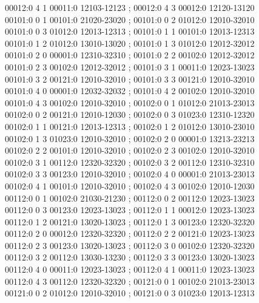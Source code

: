 \documentclass[11pt]{article}
\theoremstyle{remark}
\numberwithin{equation}{section}
\numberwithin{table}{section}
\begin{document}
\begin{flushleft}
00012:0 4 1 00011:0 12103-12123 ; 00012:0 4 3 00012:0 12120-13120\\
00101:0 0 1 00101:0 21020-23020 ; 00101:0 0 2 01012:0 12010-32010\\
00101:0 0 3 01012:0 12013-12313 ; 00101:0 1 1 00101:0 12013-12313\\
00101:0 1 2 01012:0 13010-13020 ; 00101:0 1 3 01012:0 12012-32012\\
00101:0 2 0 00001:0 12310-32310 ; 00101:0 2 2 00102:0 12012-32012\\
00101:0 2 3 00102:0 12012-32012 ; 00101:0 3 1 00011:0 12023-13023\\
00101:0 3 2 00121:0 12010-32010 ; 00101:0 3 3 00121:0 12010-32010\\
00101:0 4 0 00001:0 12032-32032 ; 00101:0 4 2 00102:0 12010-32010\\
00101:0 4 3 00102:0 12010-32010 ; 00102:0 0 1 01012:0 21013-23013\\
00102:0 0 2 00121:0 12010-12030 ; 00102:0 0 3 01023:0 12310-12320\\
00102:0 1 1 00121:0 12013-12313 ; 00102:0 1 2 01012:0 13010-23010\\
00102:0 1 3 01023:0 12010-32010 ; 00102:0 2 0 00001:0 13213-23213\\
00102:0 2 2 00101:0 12010-32010 ; 00102:0 2 3 00102:0 12010-32010\\
00102:0 3 1 00112:0 12320-32320 ; 00102:0 3 2 00112:0 12310-32310\\
00102:0 3 3 00123:0 12010-32010 ; 00102:0 4 0 00001:0 21013-23013\\
00102:0 4 1 00101:0 12010-32010 ; 00102:0 4 3 00102:0 12010-12030\\
00112:0 0 1 00102:0 21030-21230 ; 00112:0 0 2 00112:0 12023-13023\\
00112:0 0 3 00123:0 12023-13023 ; 00112:0 1 1 00012:0 12023-13023\\
00112:0 1 2 00121:0 13020-13023 ; 00112:0 1 3 00123:0 12320-32320\\
00112:0 2 0 00012:0 12320-32320 ; 00112:0 2 2 00121:0 12023-13023\\
00112:0 2 3 00123:0 13020-13023 ; 00112:0 3 0 00102:0 12320-32320\\
00112:0 3 2 00112:0 13030-13230 ; 00112:0 3 3 00123:0 13020-13023\\
00112:0 4 0 00011:0 12023-13023 ; 00112:0 4 1 00011:0 12023-13023\\
00112:0 4 3 00112:0 12320-32320 ; 00121:0 0 1 00102:0 21013-23013\\
00121:0 0 2 01012:0 12010-32010 ; 00121:0 0 3 01023:0 12013-12313\\

\end{flushleft}
\end{document}
